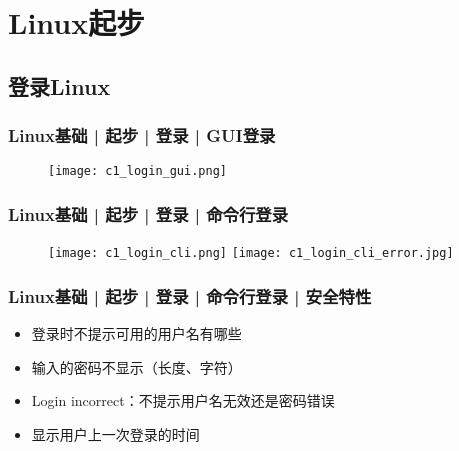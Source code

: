\section{Linux起步}
\subsection{登录Linux}
\begin{frame}
  \frametitle{Linux基础 | 起步 | 登录 | GUI登录}
  \begin{figure}
    \centering
    \texttt{[image: c1\_login\_gui.png]}
  \end{figure}
\end{frame}

\begin{frame}
  \frametitle{Linux基础 | 起步 | 登录 | 命令行登录}
  \begin{figure}
    \centering
    \texttt{[image: c1\_login\_cli.png]}
    \vspace{0.1cm}
    \texttt{[image: c1\_login\_cli\_error.jpg]}
  \end{figure}
\end{frame}

\begin{frame}
  \frametitle{Linux基础 | 起步 | 登录 | 命令行登录 | 安全特性}
  \begin{itemize}[<+->]
    \item 登录时不提示可用的用户名有哪些
    \item 输入的密码不显示（长度、字符）
    \item Login incorrect：不提示用户名无效还是密码错误
    \item 显示用户上一次登录的时间
  \end{itemize}
\end{frame}

